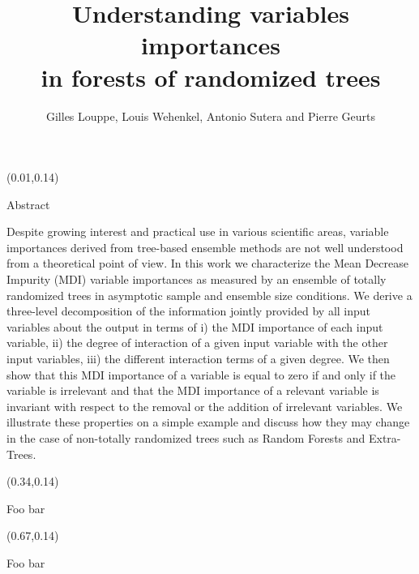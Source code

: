 \documentclass[final]{beamer}
\title{Understanding variables importances\\
in forests of randomized trees}
\author{Gilles Louppe, Louis Wehenkel, Antonio Sutera and Pierre Geurts}
\date{}
\begin{document}
\begin{frame}{}

\begin{textblock}{0.32}(0.01,0.14)




\begin{block}{Abstract \phantom{p}}

Despite growing interest and practical use in various scientific areas, variable
importances derived from tree-based ensemble methods are not well understood
from a theoretical point of view. In this work we characterize the Mean Decrease
Impurity (MDI) variable importances as measured by an ensemble of totally
randomized trees in asymptotic sample and ensemble size conditions. We derive a
three-level decomposition of the  information jointly provided by all input
variables about the output in terms of i) the MDI importance of each input
variable, ii) the degree of interaction of a given input variable with the other
input variables, iii) the different interaction terms of a given degree. We then
show that this MDI importance of a variable is equal to zero if and only if the
variable is irrelevant and that the MDI importance of a relevant variable is
invariant with respect to the removal or the addition of irrelevant variables.
We illustrate these properties on a simple example and discuss how they may
change in the case of  non-totally randomized trees such as Random Forests and
Extra-Trees.

\end{block}

\end{textblock}




\begin{textblock}{0.32}(0.34,0.14)

\begin{block}{Foo bar \phantom{p}}

\end{block}

\end{textblock}



\begin{textblock}{0.32}(0.67,0.14)

\begin{block}{Foo bar \phantom{p}}

\end{block}

\end{textblock}




\end{frame}
\end{document}
